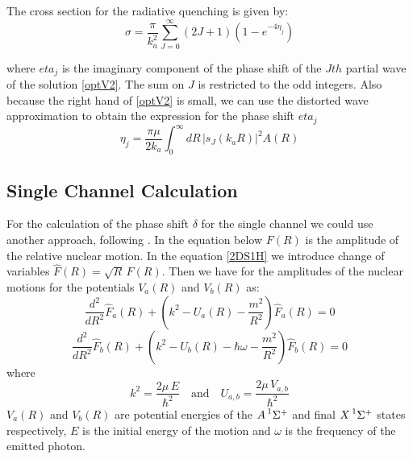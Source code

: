 The cross section for the radiative quenching is given by:
\begin{equation}
\sigma = \frac{\pi}{k_a^2}\sum_{J=0}^{\infty}{(2J+1)\left(1-e^{-4\eta_j}\right) }
\end{equation}

where $ eta_j $ is the imaginary component of the phase shift of the $ Jth $ partial wave of the solution \eqref{optV2}. The sum on $ J $ is restricted to the odd integers. 
Also because the right hand of \eqref{optV2} is small, we can use the distorted wave approximation to obtain the expression for the phase shift $ eta_j $
\begin{equation}\label{eta1}
\eta_j = \frac{\pi\mu}{2k_a}\int_0^{\infty}{dR\,\left|s_J\left(k_aR\right)\right|^2A(R) }
\end{equation}

\subsection{Single Channel Calculation}

For the calculation of the phase shift $\delta $ for the single channel we could use another approach, following \cite{ScatterIntro}. In the equation below $ F(R) $ is the amplitude of the  relative nuclear motion.
In the equation \eqref{2DS1H} we introduce change of variables $ \hat{F}(R) = \sqrt{R}\,F(R) $. 
Then we have for the amplitudes of the nuclear motions for  the potentials $ V_a(R) $ and $ V_b(R) $ as:
\begin{equation}\label{Fa}
\frac{d^2}{d R^2}\hat{F}_a(R) + \left(k^2 - U_a(R) - \frac{m^2}{R^2}\right)\hat{F}_a(R) = 0
\end{equation}
\begin{equation}\label{Fb}
\frac{d^2}{d R^2}\hat{F}_b(R) + \left(k^2 - U_b(R) - \hbar\omega - \frac{m^2}{R^2}\right)\hat{F}_b(R) = 0
\end{equation}
where
\begin{equation}
k^2 = \frac{2\mu\,E}{\hbar^2}\,\,\,\,\text{ and }\,\,\,\, U_{a,b}=\frac{2\mu\,V_{a,b}}{\hbar^2}
\end{equation}
$ V_a(R) $ and $ V_b(R) $ are potential energies of the $ A \prescript{1}{}\Sigma^+ $  and final $ X \prescript{1}{}\Sigma^+ $ states respectively, $ E $ is the initial energy of the motion and $ \omega $ is the frequency of the emitted photon.

